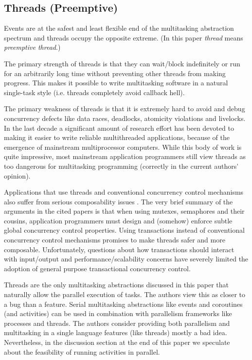 \documentclass[10pt,preprint]{sigplanconf}
\begin{document}
\subsection{Threads (Preemptive)}

Events are at the safest and least flexible end of the multitasking abstraction spectrum and threads occupy the opposite extreme.
(In this paper \emph{thread} means \emph{preemptive thread}.)

The primary strength of threads is that they can wait/block indefinitely or run for an arbitrarily long time without preventing other threads from making progress.
This makes it possible to write multitasking software in a natural single-task style (i.e. threads completely avoid callback hell).

The primary weakness of threads is that it is extremely hard to avoid and debug concurrency defects like data races, deadlocks, atomicity violations and livelocks.
In the last decade a significant amount of research effort has been devoted to making it easier to write reliable multithreaded applications, because of the emergence of mainstream multiprocessor computers.
While this body of work is quite impressive, most mainstream application programmers still view threads as too dangerous for multitasking programming (correctly in the current authors' opinion).

Applications that use threads and conventional concurrency control mechanisms also suffer from serious composability issues \cite{Harris2005, Grossman2007}.
The very brief summary of the arguments in the cited papers is that when using mutexes, semaphores and their cousins, application programmers must design and (somehow) enforce subtle global concurrency control properties.
Using transactions instead of conventional concurrency control mechanisms promises to make threads safer and more composable.
Unfortunately, questions about how transactions should interact with input/output and performance/scalability concerns have severely limited the adoption of general purpose transactional concurrency control.

Threads are the only multitasking abstractions discussed in this paper that naturally allow the parallel execution of tasks.
The authors view this as closer to a bug than a feature.
Serial multitasking abstractions like events and coroutines (and activities) can be used in combination with parallelism frameworks like processes and threads.
The authors consider providing both parallelism and multitasking in a single language features (like threads) mostly a bad idea.
Nevertheless, in the discussion section at the end of this paper we speculate about the feasibility of running activities in parallel.
\end{document}

